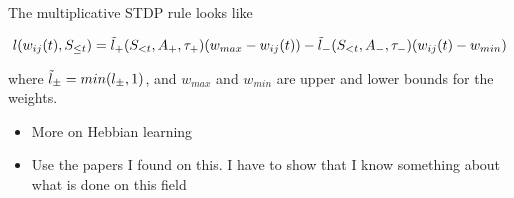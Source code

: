 The multiplicative STDP rule looks like

\begin{equation}
    l(w_{ij}(t), S_{\leq t}) = \Tilde{l}_+(S_{<t}, A_+,\tau_+)(w_{max} - w_{ij}(t))  - \Tilde{l}_-(S_{<t}, A_-,\tau_-)(w_{ij}(t) - w_{min})
\end{equation}

where $\Tilde{l}_{\pm} = min(l_{\pm},1)$, and $w_{max}$ and $w_{min}$ are upper and lower bounds for the weights. 

\begin{itemize}
    \item More on Hebbian learning
    \item Use the papers I found on this. I have to show that I know something about what is done on this field
\end{itemize}




\cleardoublepage